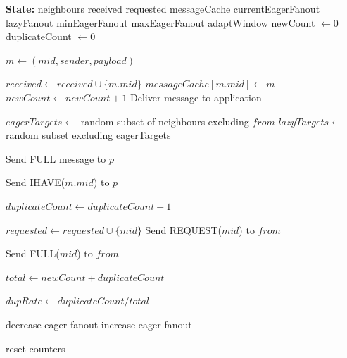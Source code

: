 \documentclass[sigconf,a4paper]{acmart}
\begin{document}
\begin{algorithm}[H]
\caption{Hybrid Gossip Broadcast}
\label{alg:hybrid}
\begin{algorithmic}[1]

\State \textbf{State:}
\State      neighbours 
\State      received
\State      requested
\State      messageCache
\State      currentEagerFanout
\State      lazyFanout
\State      minEagerFanout
\State      maxEagerFanout
\State      adaptWindow
\State      newCount $\gets 0$
\State      duplicateCount $\gets 0$

    \State $m \gets (mid, sender, payload)$
    \State {}
\EndProcedure

        \State $received \gets received \cup \{m.mid\}$
        \State $messageCache[m.mid] \gets m$
        \State $newCount \gets newCount + 1$
        \State Deliver message to application

        \State $eagerTargets \gets$ random subset of neighbours excluding $from$
        \State $lazyTargets \gets$ random subset excluding eagerTargets

            \State Send FULL message to $p$
        \EndFor

            \State Send IHAVE($m.mid$) to $p$
        \EndFor

    \Else
        \State $duplicateCount \gets duplicateCount + 1$
    \EndIf

    \State {}
\EndProcedure

        \State $requested \gets requested \cup \{mid\}$
        \State Send REQUEST($mid$) to $from$
    \EndIf
\EndProcedure

        \State Send FULL($mid$) to $from$
    \EndIf
\EndProcedure

    \State $total \gets newCount + duplicateCount$
        \State \Return
    \EndIf

    \State $dupRate \gets duplicateCount / total$

        \State decrease eager fanout
        \State increase eager fanout
    \EndIf

    \State reset counters
\EndProcedure

\end{algorithmic}
\end{algorithm}
\end{document}
